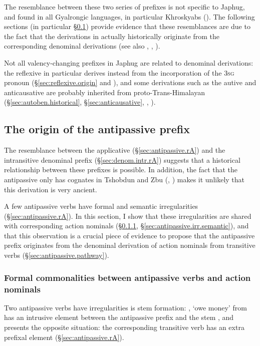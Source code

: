 The resemblance between these two series of prefixes is not specific to Japhug, and found in all Gyalrongic languages, in particular Khroskyabs (\citealt[527]{lai17khroskyabs}). The following sections (in particular §\ref{sec:antipassive.history}) provide evidence that these resemblances are due to the fact that the derivations in  actually historically originate from the corresponding denominal derivations (see also \citealt{jacques14antipassive, jacques15causative}, \citealt[527--529]{lai17khroskyabs}, \citealt{lai20denom}).

Not all valency-changing prefixes in Japhug are related to denominal derivations: the reflexive  in particular derives instead from the incorporation of the \textsc{3sg} pronoun (§\ref{sec:reflexive.origin} and \citealt{jacques10refl}), and some derivations such as the autive and anticausative are probably inherited from proto-Trans-Himalayan  (§\ref{sec:autoben.historical}, §\ref{sec:anticausative}, \citealt{sagart12sprefix}, \citealt{jacques15spontaneous}).

\subsection{The origin of the  antipassive prefix} \label{sec:antipassive.history} 
The resemblance between the  applicative (§\ref{sec:antipassive.rA}) and the intransitive denominal  prefix (§\ref{sec:denom.intr.rA}) suggests that a historical relationship between these prefixes is possible. In addition, the fact that the antipassive only has cognates in Tshobdun and Zbu (\citealt{jackson06paisheng, jackson14morpho}, \citealt{jacques21antipass}) makes it unlikely that this derivation is very ancient.

A few antipassive verbs have formal and semantic irregularities (§\ref{sec:antipassive.rA}). In this section, I show that these irregularities are shared with corresponding action nominals (§\ref{sec:antipassive.irr.form}, §\ref{sec:antipassive.irr.semantic}), and that this observation is a crucial piece of evidence to propose that the antipassive prefix originates from the denominal derivation of action nominals from transitive verbs (§\ref{sec:antipassive.pathway}).

 
\subsubsection{Formal commonalities between antipassive verbs and action nominals} \label{sec:antipassive.irr.form} 
Two antipassive verbs have irregularities is stem formation: , `owe money'  from  has an intrusive  element between the antipassive  prefix and the stem , and  presents the opposite situation: the corresponding transitive verb  has an extra prefixal  element (§\ref{sec:antipassive.rA}).

